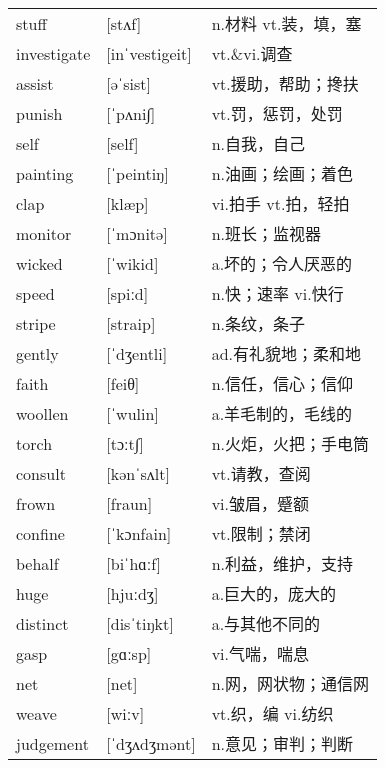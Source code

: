 \documentclass[a4paper]{article}
\begin{document}
\section{}
\begin{tabular}{l l l}

stuff & [stʌf] & n.材料 vt.装，填，塞 \\
investigate & [inˈvestigeit] & vt.\&vi.调查 \\
assist & [əˈsist] & vt.援助，帮助；搀扶 \\
punish & [ˈpʌni∫] & vt.罚，惩罚，处罚 \\
self & [self] & n.自我，自己 \\
painting & [ˈpeintiŋ] & n.油画；绘画；着色 \\
clap & [klæp] & vi.拍手 vt.拍，轻拍 \\
monitor & [ˈmɔnitə] & n.班长；监视器 \\
wicked & [ˈwikid] & a.坏的；令人厌恶的 \\
speed & [spiːd] & n.快；速率 vi.快行 \\
stripe & [straip] & n.条纹，条子 \\
gently & [ˈdʒentli] & ad.有礼貌地；柔和地 \\
faith & [feiθ] & n.信任，信心；信仰 \\
woollen & [ˈwulin] & a.羊毛制的，毛线的 \\
torch & [tɔːt∫] & n.火炬，火把；手电筒 \\
consult & [kənˈsʌlt] & vt.请教，查阅 \\
frown & [fraun] & vi.皱眉，蹙额 \\
confine & [ˈkɔnfain] & vt.限制；禁闭 \\
behalf & [biˈhɑːf] & n.利益，维护，支持 \\
huge & [hjuːdʒ] & a.巨大的，庞大的 \\
distinct & [disˈtiŋkt] & a.与其他不同的 \\
gasp & [gɑːsp] & vi.气喘，喘息 \\
net & [net] & n.网，网状物；通信网 \\
weave & [wiːv] & vt.织，编 vi.纺织 \\
judgement & [ˈdʒʌdʒmənt] & n.意见；审判；判断 \\

\end{tabular}
\end{document}
